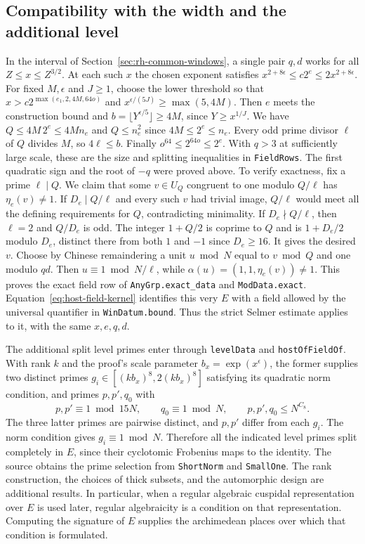 \subsection{Compatibility with the width and the additional level}

In the interval of Section~\ref{sec:rh-common-windows}, a single pair
$q,d$ works for all $Z\le x\le Z^{3/2}$. At each such $x$ the
chosen exponent satisfies $x^{2+8\epsilon}\le c2^e\le
2x^{2+8\epsilon}$. For fixed $M,\epsilon$ and $J\ge1$, choose the
lower threshold so that $x>c2^{\max(e_1,2,4M,64o)}$ and
$x^{\epsilon/(5J)}\ge\max(5,4M)$. Then $e$ meets the construction
bound and $b=\lfloor Y^{\epsilon/5}\rfloor\ge4M$, since
$Y\ge x^{1/J}$. We have $Q\le4M\,2^e\le4M n_e$ and
$Q\le n_e^2$ since $4M\le2^e\le n_e$. Every odd prime divisor
$\ell$ of $Q$ divides $M$, so $4\ell\le b$. Finally
$o^{64}\le 2^{64o}\le2^e$. With $q>3$ at sufficiently large
scale, these are the size and splitting inequalities in
\texttt{FieldRows}. The first quadratic sign and the root of $-q$
were proved above. To verify exactness, fix a prime $\ell\mid Q$. We claim that
some $v\in U_Q$ congruent to one modulo $Q/\ell$ has
$\eta_e(v)\ne1$. If $D_e\mid Q/\ell$ and every such $v$ had
trivial image, $Q/\ell$ would meet all the defining requirements
for $Q$, contradicting minimality. If $D_e\nmid Q/\ell$, then
$\ell=2$ and $Q/D_e$ is odd. The integer $1+Q/2$ is coprime to
$Q$ and is $1+D_e/2$ modulo $D_e$, distinct there from both $1$
and $-1$ since $D_e\ge16$. It gives the desired $v$. Choose by
Chinese remaindering a unit $u\bmod N$ equal to $v\bmod Q$ and one
modulo $qd$. Then $u\equiv1\bmod N/\ell$, while
$\alpha(u)=(1,1,\eta_e(v))\ne1$. This proves the exact field row
of \texttt{AnyGrp.exact\_data} and \texttt{ModData.exact}.
Equation~\eqref{eq:host-field-kernel} identifies this very $E$ with
a field allowed by the universal quantifier in \texttt{WinDatum.bound}.
Thus the strict Selmer estimate applies to it, with the same $x,e,q,d$.

The additional split level primes enter through
\texttt{levelData} and \texttt{hostOfFieldOf}. With rank $k$ and the
proof's scale parameter $b_x=\exp(x^\epsilon)$, the former supplies
two distinct primes $g_i\in[(kb_x)^8,2(kb_x)^8]$ satisfying its
quadratic norm condition, and primes $p,p',q_0$ with
\[
 p,p'\equiv1\bmod 15N,\qquad q_0\equiv1\bmod N,\qquad
             p,p',q_0\le N^{C_8}.
\]
The three latter primes are pairwise distinct, and $p,p'$ differ
from each $g_i$. The norm condition gives $g_i\equiv1\bmod N$.
Therefore all the indicated level primes split completely in $E$,
since their cyclotomic Frobenius maps to the identity. The source
obtains the prime selection from \texttt{ShortNorm} and
\texttt{SmallOne}. The rank construction, the choices of thick
subsets, and the automorphic design are additional results. In
particular, when a regular algebraic cuspidal representation over $E$
is used later, regular algebraicity is a condition on that
representation. Computing the signature of $E$ supplies the
archimedean places over which that condition is formulated.

